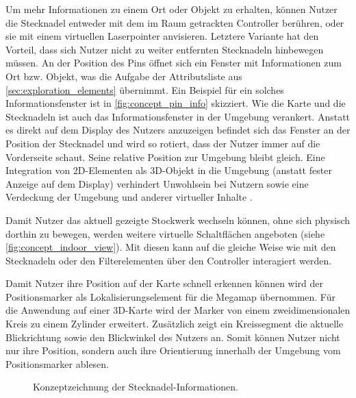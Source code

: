 \newpage
Um mehr Informationen zu einem Ort oder Objekt zu erhalten, können Nutzer die Stecknadel entweder mit dem im Raum getrackten Controller berühren, oder sie mit einem virtuellen Laserpointer anvisieren.
Letztere Variante hat den Vorteil, dass sich Nutzer nicht zu weiter entfernten Stecknadeln hinbewegen müssen.
An der Position des Pins öffnet sich ein Fenster mit Informationen zum Ort bzw. Objekt, was die Aufgabe der Attributsliste aus \autoref{sec:exploration_elements} übernimmt.
Ein Beispiel für ein solches Informationsfenster ist in \autoref{fig:concept_pin_info} skizziert.
Wie die Karte und die Stecknadeln ist auch das Informationsfenster in der Umgebung verankert.
Anstatt es direkt auf dem Display des Nutzers anzuzeigen befindet sich das Fenster an der Position der Stecknadel und wird so rotiert, dass der Nutzer immer auf die Vorderseite schaut.
Seine relative Position zur Umgebung bleibt gleich.
Eine Integration von 2D-Elementen als 3D-Objekt in die Umgebung (anstatt fester Anzeige auf dem Display) verhindert Unwohlsein bei Nutzern sowie eine Verdeckung der Umgebung und anderer virtueller Inhalte \parencite[23]{Schroeder2017}.

Damit Nutzer das aktuell gezeigte Stockwerk wechseln können, ohne sich physisch dorthin zu bewegen, werden weitere virtuelle Schaltflächen angeboten (siehe \autoref{fig:concept_indoor_view}).
Mit diesen kann auf die gleiche Weise wie mit den Stecknadeln oder den Filterelementen über den Controller interagiert werden.

Damit Nutzer ihre Position auf der Karte schnell erkennen können wird der Positionsmarker als Lokalisierungselement für die Megamap übernommen.
Für die Anwendung auf einer 3D-Karte wird der Marker von einem zweidimensionalen Kreis zu einem Zylinder erweitert.
Zusätzlich zeigt ein Kreissegment die aktuelle Blickrichtung sowie den Blickwinkel des Nutzers an.
Somit können Nutzer nicht nur ihre Position, sondern auch ihre Orientierung innerhalb der Umgebung vom Positionsmarker ablesen.

\begin{figure}[bth]
	\centering
	\caption{Konzeptzeichnung der Stecknadel-Informationen.}
	\label{fig:concept_pin_info}
\end{figure}

